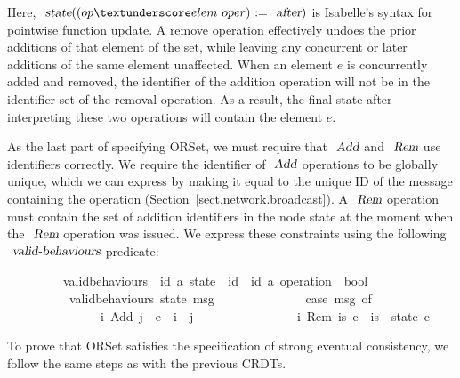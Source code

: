 \vspace{0.25em}
Here, $\isa{state}{\isacharparenleft}{\isacharparenleft}op{\isacharunderscore}elem\ oper{\isacharparenright}\ {\isacharcolon}{\isacharequal}\ \isa{after}{\isacharparenright}$ is Isabelle's syntax for pointwise function update.
A remove operation effectively undoes the prior additions of that element of the set, while leaving any concurrent or later additions of the same element unaffected.
When an element $e$ is concurrently added and removed, the identifier of the addition operation will not be in the identifier set of the removal operation.
As a result, the final state after interpreting these two operations will contain the element $e$.

As the last part of specifying ORSet, we must require that $\isa{Add}$ and $\isa{Rem}$ use identifiers correctly.
We require the identifier of $\isa{Add}$ operations to be globally unique, which we can express by making it equal to the unique ID of the message containing the operation (Section~\ref{sect.network.broadcast}).
A $\isa{Rem}$ operation must contain the set of addition identifiers in the node state at the moment when the $\isa{Rem}$ operation was issued.
We express these constraints using the following $\isa{valid-behaviours}$ predicate:
\vspace{0.25em}
\begin{isabellebody}
\ \ \ \ \ \ \ \ \ valid{\isacharunderscore}behaviours\ {\isacharcolon}{\isacharcolon}\ {\isachardoublequoteopen}{\isacharparenleft}{\isacharprime}id{\isacharcomma}\ {\isacharprime}a{\isacharparenright}\ state\ {\isasymRightarrow}\ {\isacharprime}id\ {\isasymtimes}\ {\isacharparenleft}{\isacharprime}id{\isacharcomma}\ {\isacharprime}a{\isacharparenright}\ operation\ {\isasymRightarrow}\ bool{\isachardoublequoteclose}\ \isanewline
\ \ \ \ \ \ \ \ \ \ {\isachardoublequoteopen}valid{\isacharunderscore}behaviours\ state\ msg\ {\isasymequiv}\isanewline
\ \ \ \ \ \ \ \ \ \ \ \ \ case\ msg\ of\isanewline
\ \ \ \ \ \ \ \ \ \ \ \ \ \ \ {\isacharparenleft}i{\isacharcomma}\ Add\ j\ \ e{\isacharparenright}\ {\isasymRightarrow}\ i\ {\isacharequal}\ j\ {\isacharbar}\isanewline
\ \ \ \ \ \ \ \ \ \ \ \ \ \ \ {\isacharparenleft}i{\isacharcomma}\ Rem\ is\ e{\isacharparenright}\ {\isasymRightarrow}\ is\ {\isacharequal}\ state\ e{\isachardoublequoteclose}
\end{isabellebody}
\vspace{0.25em}
To prove that ORSet satisfies the specification of strong eventual consistency, we follow the same steps as with the previous CRDTs.
